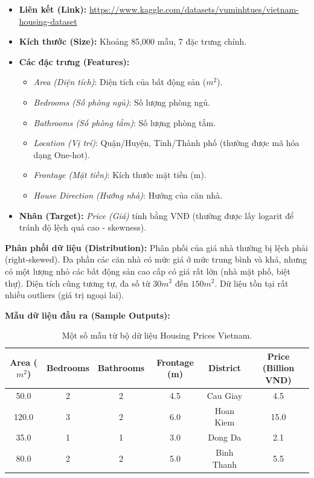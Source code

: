 \begin{itemize}
    \item \textbf{Liên kết (Link):} \url{https://www.kaggle.com/datasets/vuminhtues/vietnam-housing-dataset}
    \item \textbf{Kích thước (Size):} Khoảng 85,000 mẫu, 7 đặc trưng chính.
    \item \textbf{Các đặc trưng (Features):}
    \begin{itemize}
        \item \textit{Area (Diện tích)}: Diện tích của bất động sản ($m^2$).
        \item \textit{Bedrooms (Số phòng ngủ)}: Số lượng phòng ngủ.
        \item \textit{Bathrooms (Số phòng tắm)}: Số lượng phòng tắm.
        \item \textit{Location (Vị trí)}: Quận/Huyện, Tỉnh/Thành phố (thường được mã hóa dạng One-hot).
        \item \textit{Frontage (Mặt tiền)}: Kích thước mặt tiền (m).
        \item \textit{House Direction (Hướng nhà)}: Hướng của căn nhà.
    \end{itemize}
    \item \textbf{Nhãn (Target):} \textit{Price (Giá)} tính bằng VNĐ (thường được lấy logarit để tránh độ lệch quá cao - skewness).
\end{itemize}

\textbf{Phân phối dữ liệu (Distribution):}
Phân phối của giá nhà thường bị lệch phải (right-skewed). Đa phần các căn nhà có mức giá ở mức trung bình và khá, nhưng có một lượng nhỏ các bất động sản cao cấp có giá rất lớn (nhà mặt phố, biệt thự). Diện tích cũng tương tự, đa số từ $30m^2$ đến $150m^2$. Dữ liệu tồn tại rất nhiều outliers (giá trị ngoại lai).

\textbf{Mẫu dữ liệu đầu ra (Sample Outputs):}
\begin{table}[h]
\centering
\begin{tabular}{|c|c|c|c|c|c|}
\hline
Area ($m^2$) & Bedrooms & Bathrooms & Frontage (m) & District & Price (Billion VND) \\
\hline
50.0 & 2 & 2 & 4.5 & Cau Giay & 4.5 \\
120.0 & 3 & 2 & 6.0 & Hoan Kiem & 15.0 \\
35.0 & 1 & 1 & 3.0 & Dong Da & 2.1 \\
80.0 & 2 & 2 & 5.0 & Binh Thanh & 5.5 \\
\hline
\end{tabular}
\caption{Một số mẫu từ bộ dữ liệu Housing Prices Vietnam.}
\end{table}

